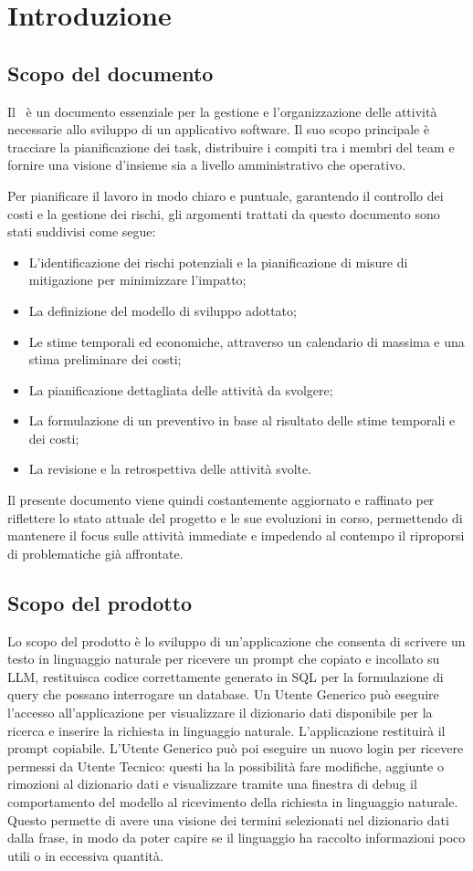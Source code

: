 \section{Introduzione}
\label{sec:introduzione}

\subsection{Scopo del documento}
Il \PdP\ è un documento essenziale per la gestione e l'organizzazione delle attività necessarie allo sviluppo di un applicativo software. Il suo scopo principale è tracciare la pianificazione dei task, distribuire i compiti tra i membri del team e fornire una visione d'insieme sia a livello amministrativo che operativo.

Per pianificare il lavoro in modo chiaro e puntuale, garantendo il controllo dei costi e la gestione dei rischi, gli argomenti trattati da questo documento sono stati suddivisi come segue:
\begin{itemize}
  \item L'identificazione dei rischi potenziali e la pianificazione di misure di mitigazione per minimizzare l'impatto;
  \item La definizione del modello di sviluppo adottato;
  \item Le stime temporali ed economiche, attraverso un calendario di massima e una stima preliminare dei costi;
  \item La pianificazione dettagliata delle attività da svolgere;
  \item La formulazione di un preventivo in base al risultato delle stime temporali e dei costi;
  \item La revisione e la retrospettiva delle attività svolte.
\end{itemize}
Il presente documento viene quindi costantemente aggiornato e raffinato per riflettere lo stato attuale del progetto e le sue evoluzioni in corso, permettendo di mantenere il focus sulle attività immediate e impedendo al contempo il riproporsi di problematiche già affrontate.
\subsection{Scopo del prodotto}
Lo scopo del prodotto è lo sviluppo di un'applicazione che consenta di scrivere un testo in linguaggio naturale per ricevere un prompt che copiato e incollato su LLM, restituisca codice correttamente generato in SQL per la formulazione di query che possano interrogare un database. 
Un Utente Generico può eseguire l'accesso all'applicazione per visualizzare il dizionario dati disponibile per la ricerca e inserire la richiesta in linguaggio naturale. 
L'applicazione restituirà il prompt copiabile. 
L'Utente Generico può poi eseguire un nuovo login per ricevere permessi da Utente Tecnico: questi ha la possibilità fare modifiche, aggiunte o rimozioni al dizionario dati e visualizzare tramite una finestra di debug il comportamento del modello al ricevimento della richiesta in linguaggio naturale. 
Questo permette di avere una visione dei termini selezionati nel dizionario dati dalla frase, in modo da poter capire se il linguaggio ha raccolto informazioni poco utili o in eccessiva quantità.
